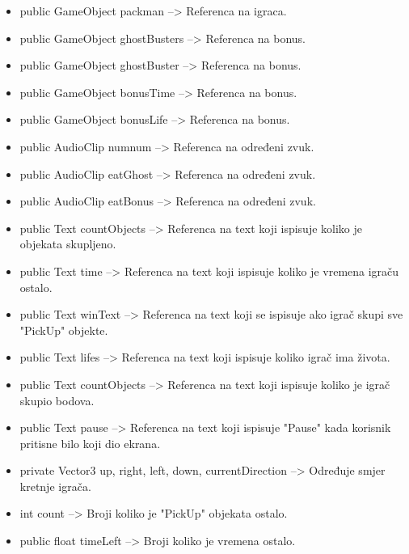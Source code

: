 \begin{itemize}
\item public GameObject packman --> Referenca na igraca.

\item public GameObject ghostBusters --> Referenca na bonus.

\item public GameObject ghostBuster --> Referenca na bonus.

\item public GameObject bonusTime --> Referenca na bonus.

\item public GameObject bonusLife --> Referenca na bonus.

\item public AudioClip numnum --> Referenca na određeni zvuk.

\item public AudioClip eatGhost --> Referenca na određeni zvuk.

\item public AudioClip eatBonus --> Referenca na određeni zvuk.

\item public Text countObjects --> Referenca na text koji ispisuje koliko je objekata skupljeno.

\item public Text time --> Referenca na text koji ispisuje koliko je vremena igraču ostalo.

\item public Text winText --> Referenca na text koji se ispisuje ako igrač skupi sve "PickUp" objekte.

\item public Text lifes --> Referenca na text koji ispisuje koliko igrač ima života.

\item public Text countObjects --> Referenca na text koji ispisuje koliko je igrač skupio bodova.

\item public Text pause --> Referenca na text koji ispisuje "Pause" kada korisnik pritisne bilo koji dio ekrana.

\item private Vector3 up, right, left, down, currentDirection --> Određuje smjer kretnje igrača.

\item int count --> Broji koliko je "PickUp" objekata ostalo.

\item public float timeLeft --> Broji koliko je vremena ostalo.


\end{itemize}
